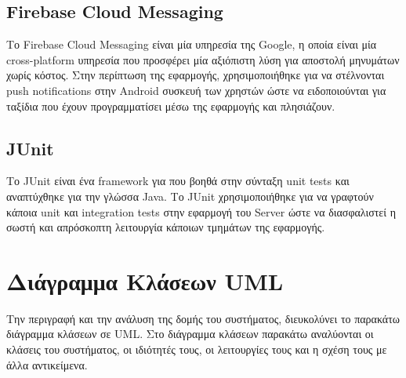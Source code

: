 \documentclass[oneside, 12pt]{book}
\begin{document}
\subsection{Firebase Cloud Messaging} Το Firebase Cloud Messaging είναι 
μία υπηρεσία της Google, η οποία είναι μία cross-platform υπηρεσία που προσφέρει 
μία αξιόπιστη λύση για αποστολή μηνυμάτων χωρίς κόστος. Στην περίπτωση της 
εφαρμογής, χρησιμοποιήθηκε για να στέλνονται push notifications στην Android 
συσκευή των χρηστών ώστε να ειδοποιούνται για ταξίδια που έχουν προγραμματίσει μέσω 
της εφαρμογής και πλησιάζουν.

\subsection{JUnit} Το JUnit είναι ένα framework για που βοηθά στην 
σύνταξη unit tests και αναπτύχθηκε για την γλώσσα Java. Το JUnit 
χρησιμοποιήθηκε για να γραφτούν κάποια unit και integration tests στην 
εφαρμογή του Server ώστε να διασφαλιστεί η σωστή και απρόσκοπτη λειτουργία κάποιων 
τμημάτων της εφαρμογής.

\section{Διάγραμμα Κλάσεων UML}
Την περιγραφή και την ανάλυση της δομής του συστήματος, διευκολύνει το παρακάτω διάγραμμα κλάσεων σε UML. Στο διάγραμμα κλάσεων παρακάτω αναλύονται οι κλάσεις του συστήματος, οι ιδιότητές τους, οι λειτουργίες τους και η σχέση τους με άλλα αντικείμενα. 
\end{document}
